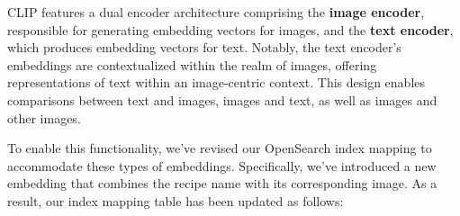 \documentclass[runningheads]{llncs}
\begin{document}
CLIP features a dual encoder architecture comprising the \textbf{image encoder}, responsible for generating embedding vectors for images, and the \textbf{text encoder}, which produces embedding vectors for text. Notably, the text encoder's embeddings are contextualized within the realm of images, offering representations of text within an image-centric context. This design enables comparisons between text and images, images and text, as well as images and other images.

To enable this functionality, we've revised our OpenSearch index mapping to accommodate these types of embeddings. Specifically, we've introduced a new embedding that combines the recipe name with its corresponding image. As a result, our index mapping table has been updated as follows:

\begin{table}[ht]
\centering
\setlength{\abovecaptionskip}{10pt} %
\caption{Updated Index Mapping}
\label{tab:mappings}
\end{table}
\end{document}
